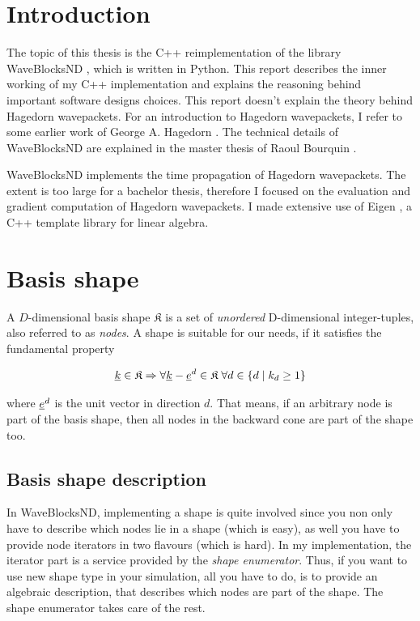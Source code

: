 \documentclass{article}
\begin{document}


\tableofcontents
\clearpage

\section{Introduction}
The topic of this thesis is the C++ reimplementation of the library WaveBlocksND
\cite{waveblocksnd}, which is written in Python.
This report describes the inner working of my C++ implementation
and explains the reasoning behind important software designs choices.
This report doesn't explain the theory behind Hagedorn wavepackets.
For an introduction to Hagedorn wavepackets, I refer to some earlier work
of George A. Hagedorn \cite{H_ladder_operators}.
The technical details of WaveBlocksND are explained
in the master thesis of Raoul Bourquin \cite{B_master_thesis}.

WaveBlocksND implements the time propagation of Hagedorn wavepackets.
The extent is too large for a bachelor thesis, therefore I focused on the
evaluation and gradient computation of Hagedorn wavepackets.
I made extensive use of Eigen \cite{eigenweb}, a C++ template library for linear algebra.

\section{Basis shape}

A \(D\)-dimensional basis shape \(\mathfrak{K}\)
is a set of \emph{unordered} D-dimensional integer-tuples, also
referred to as \emph{nodes}.  A shape is suitable for our needs, if it
satisfies the fundamental property

\begin{equation}
  \label{eq:basis_shape_fundamental_property}
  \underline{k} \in \mathfrak{K} \Rightarrow \forall
  \underline{k}-\underline{e}^d \in \mathfrak{K} \;\forall d \in \{d \;|\;k_d \geq 1\}
\end{equation}

where \(\underline{e}^d\) is the unit vector in direction \(d\).
That means, if an arbitrary node is part of the basis shape, then all nodes
in the backward cone are part of the shape too.

\subsection{Basis shape description}
In WaveBlocksND, implementing a shape is quite involved since you
non only have to describe which nodes lie in a shape (which is easy),
as well you have to provide node iterators in two flavours (which is hard).
In my implementation, the iterator part is a service provided by the
\emph{shape enumerator}. Thus, if you want to use new shape type in your simulation,
all you have to do, is to provide an algebraic description, that describes
which nodes are part of the shape. The shape enumerator takes care of the rest.
\end{document}
